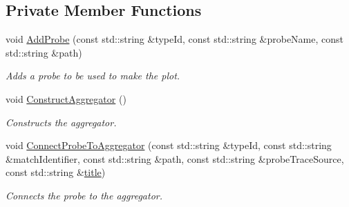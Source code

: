 \subsection*{Private Member Functions}
\begin{DoxyCompactItemize}
\item 
void \hyperlink{classns3_1_1GnuplotHelper_ad5e798aeffe53074d5792ee2d33561ec}{Add\+Probe} (const std\+::string \&type\+Id, const std\+::string \&probe\+Name, const std\+::string \&path)
\begin{DoxyCompactList}\small\item\em Adds a probe to be used to make the plot. \end{DoxyCompactList}\item 
void \hyperlink{classns3_1_1GnuplotHelper_adfc20ddca26ff51ca0916a3a08627f9f}{Construct\+Aggregator} ()
\begin{DoxyCompactList}\small\item\em Constructs the aggregator. \end{DoxyCompactList}\item 
void \hyperlink{classns3_1_1GnuplotHelper_ad80ba9cf7fe4c4c5fc9c165d7d04955d}{Connect\+Probe\+To\+Aggregator} (const std\+::string \&type\+Id, const std\+::string \&match\+Identifier, const std\+::string \&path, const std\+::string \&probe\+Trace\+Source, const std\+::string \&\hyperlink{lte__link__budget__x2__handover__measures_8m_a3f4b991df405379f6917e1683ed5a8c8}{title})
\begin{DoxyCompactList}\small\item\em Connects the probe to the aggregator. \end{DoxyCompactList}\end{DoxyCompactItemize}
